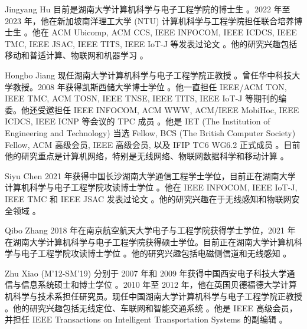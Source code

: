 \documentclass[journal]{IEEEtran}
\begin{document}
\begin{IEEEbiography}[{\rule{1in}{1.25in}}]{Jingyang Hu}
目前是湖南大学计算机科学与电子工程学院的博士生 。2022 年至 2023 年，他在新加坡南洋理工大学 (NTU) 计算机科学与工程学院担任联合培养博士生 。他在 ACM Ubicomp, ACM CCS, IEEE INFOCOM, IEEE ICDCS, IEEE TMC, IEEE JSAC, IEEE TITS, IEEE IoT-J 等发表过论文 。他的研究兴趣包括移动和普适计算、物联网和机器学习 。
\end{IEEEbiography}

\begin{IEEEbiography}[{\rule{1in}{1.25in}}]{Hongbo Jiang}
现任湖南大学计算机科学与电子工程学院正教授 。曾任华中科技大学教授。2008 年获得凯斯西储大学博士学位 。他一直担任 IEEE/ACM TON, IEEE TMC, ACM TOSN, IEEE TNSE, IEEE TITS, IEEE IoT-J 等期刊的编委。他还受邀担任 IEEE INFOCOM, ACM WWW, ACM/IEEE MobiHoc, IEEE ICDCS, IEEE ICNP 等会议的 TPC 成员 。他是 IET (The Institution of Engineering and Technology) 当选 Fellow, BCS (The British Computer Society) Fellow, ACM 高级会员, IEEE 高级会员, 以及 IFIP TC6 WG6.2 正式成员 。目前他的研究重点是计算机网络，特别是无线网络、物联网数据科学和移动计算 。
\end{IEEEbiography}

\begin{IEEEbiography}[{\rule{1in}{1.25in}}]{Siyu Chen}
2021 年获得中国长沙湖南大学通信工程学士学位，目前正在湖南大学计算机科学与电子工程学院攻读博士学位 。他在 IEEE INFOCOM, IEEE IoT-J, IEEE TMC 和 IEEE JSAC 发表过论文 。他的研究兴趣在于无线感知和物联网安全领域 。
\end{IEEEbiography}

\begin{IEEEbiography}[{\rule{1in}{1.25in}}]{Qibo Zhang}
2018 年在南京航空航天大学电子与工程学院获得学士学位，2021 年在湖南大学计算机科学与电子工程学院获得硕士学位。目前正在湖南大学计算机科学与电子工程学院攻读博士学位 。他的研究兴趣包括电磁侧信道和无线感知 。
\end{IEEEbiography}

\begin{IEEEbiography}[{\rule{1in}{1.25in}}]{Zhu Xiao}
(M'12-SM'19) 分别于 2007 年和 2009 年获得中国西安电子科技大学通信与信息系统硕士和博士学位 。2010 年至 2012 年，他在英国贝德福德大学计算机科学与技术系担任研究员。现任中国湖南大学计算机科学与电子工程学院正教授 。他的研究兴趣包括无线定位、车联网和智能交通系统 。他是 IEEE 高级会员，并担任 IEEE Transactions on Intelligent Transportation Systems 的副编辑 。
\end{IEEEbiography}
\end{document}

